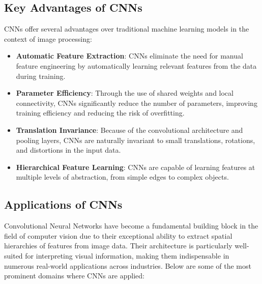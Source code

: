 \subsection{Key Advantages of CNNs}
CNNs offer several advantages over traditional machine learning models in the context of image processing:
\begin{itemize}
    \item \textbf{Automatic Feature Extraction}: CNNs eliminate the need for manual feature engineering by automatically learning relevant features from the data during training.
    \item \textbf{Parameter Efficiency}: Through the use of shared weights and local connectivity, CNNs significantly reduce the number of parameters, improving training efficiency and reducing the risk of overfitting.
    \item \textbf{Translation Invariance}: Because of the convolutional architecture and pooling layers, CNNs are naturally invariant to small translations, rotations, and distortions in the input data.
    \item \textbf{Hierarchical Feature Learning}: CNNs are capable of learning features at multiple levels of abstraction, from simple edges to complex objects.

\end{itemize}

\subsection{Applications of CNNs}
Convolutional Neural Networks have become a fundamental building block in the field of computer vision due to their exceptional ability to extract spatial hierarchies of features from image data. Their architecture is particularly well-suited for interpreting visual information, making them indispensable in numerous real-world applications across industries. Below are some of the most prominent domains where CNNs are applied:

